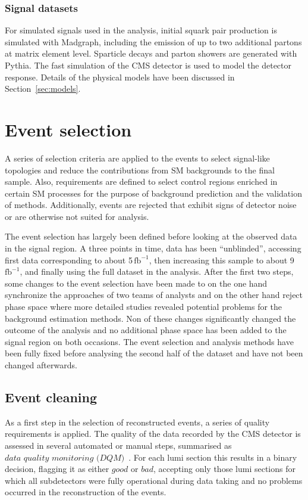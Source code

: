 \subsubsection{Signal datasets}
For simulated signals used in the analysis, initial squark pair production is simulated with Madgraph, including the emission of up to two additional partons at matrix element level. Sparticle decays and parton showers are generated with Pythia. The fast simulation of the CMS detector is used to model the detector response. Details of the physical models have been discussed in Section~\ref{sec:models}.
\section{Event selection}
\label{sec:eventsel}
A series of selection criteria are applied to the events to select signal-like topologies and reduce the contributions from SM backgrounds to the final sample. Also, requirements are defined to select control regions enriched in certain SM processes for the purpose of background prediction and the validation of methods. Additionally, events are rejected that exhibit signs of detector noise or are otherwise not suited for analysis. 

The event selection has largely been defined before looking at the observed data in the signal region. A three points in time, data has been ``unblinded'', accessing first data corresponding to about 5\,$\mathrm{fb^{-1}}$, then increasing this sample to about 9\,$\mathrm{fb^{-1}}$, and finally using the full dataset in the analysis. After the first two steps, some changes to the event selection have been made to on the one hand synchronize the approaches of two teams of analysts and on the other hand reject phase space where more detailed studies revealed potential problems for the background estimation methods. Non of these changes significantly changed the outcome of the analysis and no additional phase space has been added to the signal region on both occasions. The event selection and analysis methods have been fully fixed before analysing the second half of the dataset and have not been changed afterwards. 

\subsection{Event cleaning}
As a first step in the selection of reconstructed events, a series of quality requirements is applied. 
The quality of the data recorded by the CMS detector is assessed in several automated or manual steps, summarised as $\textit{data quality monitoring (DQM)}$~\cite{DQM}. For each lumi section this results in a binary decision, flagging it as either $\textit{good}$ or $\textit{bad}$, accepting only those lumi sections for which all subdetectors were fully operational during data taking and no problems occurred in the reconstruction of the events.

